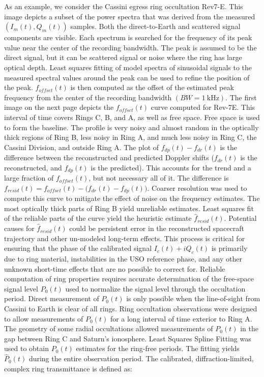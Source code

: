 \documentclass[oneside]{book}
\theoremstyle{mystyle}
\begin{document}
\noindent As an example, we consider the Cassini egress ring occultation Rev7-E. This image depicts a subset of the power spectra that was derived from the measured $(I_{m}(t), Q_{m}(t))$ samples. Both the direct-to-Earth and scattered signal components are visible. Each spectrum is searched for the frequency of its peak value near the center of the recording bandwidth. The peak is assumed to be the direct signal, but it can be scattered signal or noise where the ring has large optical depth. Least squares fitting of model spectra of sinusoidal signals to the measured spectral values around the peak can be used to refine the position of the peak. $f_{offset}(t)$ is then computed as the offset of the estimated peak frequency from the center of the recording bandwidth $(BW = 1\ \textrm{kHz})$. The first image on the next page depicts the $f_{offset}(t)$ curve computed for Rev-7E. This interval of time covers Rings C, B, and A, as well as free space. Free space is used to form the baseline. The profile is very noisy and almost random in the optically thick regions of Ring B, less noisy in Ring A, and much less noisy in Ring C, the Cassini Division, and outside Ring A. The plot of $f_{dp}(t) - f_{dr}(t)$ is the difference between the reconstructed and predicted Doppler shifts ($f_{dr}(t)$ is the reconstructed, and $f_{dp}(t)$ is the predicted). This accounts for the trend and a large fraction of $f_{offset}(t)$, but not necessary all of it. The difference is $f_{resid}(t) = f_{offset}(t) - \big(f_{dr}(t)-f_{dp}(t)\big)$. Coarser resolution was used to compute this curve to mitigate the effect of noise on the frequency estimates.
\noindent The most optically thick parts of Ring B yield unreliable estimates. Least squares fit of the reliable parts of the curve yield the heuristic estimate $\hat{f}_{resid}(t)$. Potential causes for $\hat{f}_{resid}(t)$ could be persistent error in the reconstructed spacecraft trajectory and other un-modeled long-term effects. This process is critical for ensuring that the phase of the calibrated signal $I_{c}(t)+iQ_{c}(t)$ is primarily due to ring material, instabilities in the USO reference phase, and any other unknown short-time effects that are no possible to correct for. Reliable computation of ring properties requires accurate determination of the free-space signal level $P_{0}(t)$ used to normalize the signal level through the occultation period. Direct measurement of $P_{0}(t)$ is only possible when the line-of-sight from Cassini to Earth is clear of all rings. Ring occultation observations were designed to allow measurements of $P_{0}(t)$ for a long interval of time exterior to Ring A. The geometry of some radial occultations allowed measurements of $P_{0}(t)$ in the gap between Ring C and Saturn's ionosphere. Least Squares Spline Fitting was used to obtain $P_{0}(t)$ estimates for the ring-free periods. The fitting yields $\hat{P}_{0}(t)$ during the entire observation period. The calibrated, diffraction-limited, complex ring transmittance is defined as:
\end{document}
